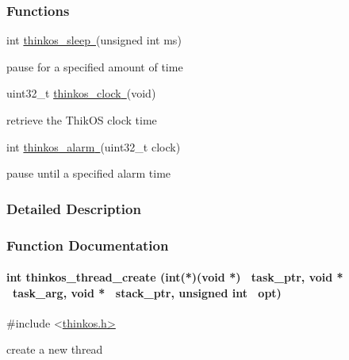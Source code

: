 \subsubsection{\texorpdfstring{{Functions}}{Functions}}\label{h.iqcme3p75udy}

{int
}{\protect\hyperlink{h.26in1rg}{thinkos\_sleep}}{\protect\hyperlink{h.26in1rg}{~}}{(unsigned
int ms)}

{pause for a specified amount of time }

{uint32\_t
}{\protect\hyperlink{h.lnxbz9}{thinkos\_clock}}{\protect\hyperlink{h.lnxbz9}{~}}{(void)}

{retrieve the ThikOS clock time }

{int
}{\protect\hyperlink{h.35nkun2}{thinkos\_alarm}}{\protect\hyperlink{h.35nkun2}{~}}{(uint32\_t
clock)}

{pause until a specified alarm time }

{}

{}

\subsubsection{\texorpdfstring{{Detailed
Description}}{Detailed Description}}\label{detailed-description}

{}

{}

\subsubsection{\texorpdfstring{{Function
Documentation}}{Function Documentation}}\label{function-documentation}

\paragraph{\texorpdfstring{{int thinkos\_thread\_create (int(*)(void *)
~task\_ptr, void * ~task\_arg, void * ~stack\_ptr, unsigned int
~opt)}}{int thinkos\_thread\_create (int(*)(void *) ~task\_ptr, void * ~task\_arg, void * ~stack\_ptr, unsigned int ~opt)}}\label{int-thinkos_thread_create-intvoid-task_ptr-void-task_arg-void-stack_ptr-unsigned-int-opt}

{}

{\#include
\textless{}}{\protect\hyperlink{h.pkwqa1}{thinkos.h}}{\protect\hyperlink{h.pkwqa1}{\textgreater{}}}

{create a new thread }

{}

